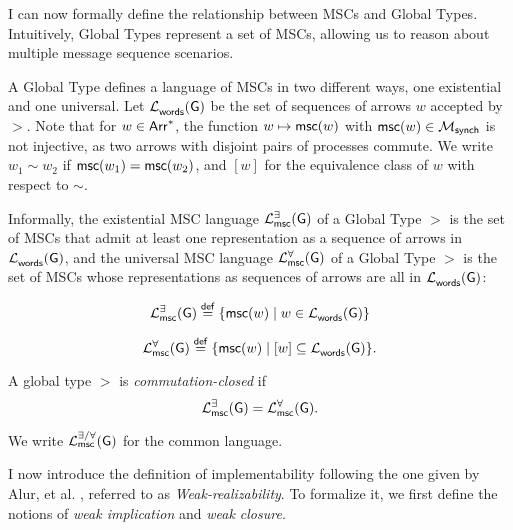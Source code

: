 


I can now formally define the relationship between MSCs and Global Types. 
Intuitively, Global Types represent a set of MSCs, allowing us to reason 
about multiple message sequence scenarios. 

A Global Type defines a language of MSCs in two different ways, one
existential and one universal. Let $\mathcal{L}_{\mathsf{words}}^{}(\mathsf{G})$ be the set of
sequences of arrows $w$ accepted by $\gt$. Note that for $w \in \mathsf{Arr}^*$,
the function $w \mapsto \mathsf{msc}(w)$ with
$\mathsf{msc}(w) \in \mathcal{M}_{\mathsf{synch}}$ is not injective, as two
arrows with disjoint pairs of processes commute. We write $w_1 \sim w_2$ if
$\mathsf{msc}(w_1) = \mathsf{msc}(w_2)$, and $[w]$ for the equivalence class
of $w$ with respect to $\sim$.

Informally, the existential MSC language $\mathcal{L}_{\mathsf{msc}}^{\exists}(\mathsf{G}){}$ of a 
Global Type $\gt$ is the set of MSCs that admit at least one representation as a
sequence of arrows in $\mathcal{L}_{\mathsf{words}}^{}(\mathsf{G})$, and the universal MSC
language $\universalmsclanguageof{\gt}$ of a Global Type $\gt$ is the set of
MSCs whose representations as sequences of arrows are all in
$\mathcal{L}_{\mathsf{words}}^{}(\mathsf{G})$:
\begin{definition}[$\existentialmsclanguageof{\gt}$]
	$$
		\mathcal{L}_{\mathsf{msc}}^{\exists}(\mathsf{G}) \stackrel{\mathsf{def}}{=} \{\mathsf{msc}(w) \mid
		w \in \mathcal{L}_{\mathsf{words}}^{}(\mathsf{G})\}
  $$
\end{definition}

\begin{definition}[$\universalmsclanguageof{\gt}$]
  $$
		\mathcal{L}_{\mathsf{msc}}^{\forall}(\mathsf{G}) \stackrel{\mathsf{def}}{=} \{\mathsf{msc}(w) \mid
		[w] \subseteq \mathcal{L}_{\mathsf{words}}^{}(\mathsf{G})\}.
	$$
\end{definition}

\begin{definition}
    A global type $\gt$ is \emph{commutation-closed} if
    $$
    \mathcal{L}_{\mathsf{msc}}^{\exists}(\mathsf{G}) = \mathcal{L}_{\mathsf{msc}}^{\forall}(\mathsf{G}).
    $$
\end{definition}
We write $\mathcal{L}_{\mathsf{msc}}^{\exists/\forall}(\mathsf{G})$ for the common language.

I now introduce the definition of implementability following the one given 
by Alur, et al. \cite{alur2005realizability}, referred to as 
\textit{Weak-realizability}.
To formalize it, we first define the notions of 
\textit{weak implication} and \textit{weak closure}.

